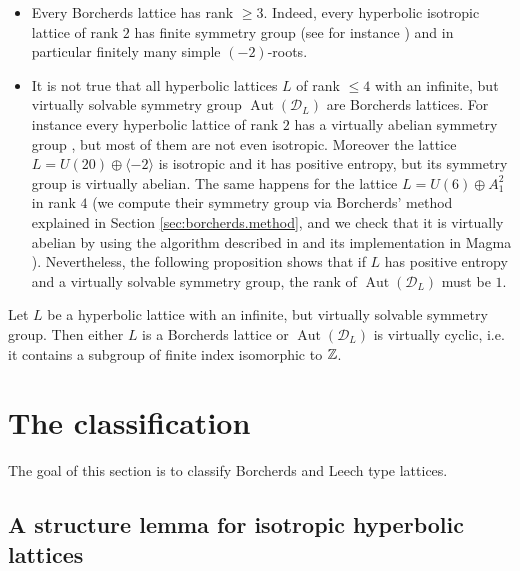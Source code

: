 \documentclass[11pt,letterpaper]{amsart}
\DeclareMathOperator{\Aut}{Aut}
\begin{document}
\begin{remark} \label{rk:useful.remarks.borcherds}
\begin{itemize}
    \item Every Borcherds lattice has rank $\ge 3$. Indeed, every hyperbolic isotropic lattice of rank $2$ %
    has finite symmetry group (see for instance \cite[Corollary~3.4]{galluzzi.lombardo.peters}) and in particular finitely many simple $(-2)$-roots.
   
    \item It is not true that all hyperbolic lattices $L$ of rank $\le 4$ with an infinite, but virtually solvable symmetry group $\Aut(\mathcal{D}_L)$ are Borcherds lattices. For instance every hyperbolic lattice of rank $2$ has a virtually abelian symmetry group \cite[Corollary~3.4]{galluzzi.lombardo.peters}, but most of them are not even isotropic.
    Moreover the lattice $L=U(20)\oplus \langle -2\rangle$ is isotropic and it has positive entropy, but its symmetry group is virtually abelian. The same happens for the lattice $L=U(6)\oplus A_1^2$ in rank $4$ (we compute their symmetry group via Borcherds' method explained in Section \ref{sec:borcherds.method}, and we check that it is virtually abelian by using the algorithm described in \cite{detinko.flannery.obrien.tits} and its implementation in Magma \cite{magma}).
    Nevertheless, the following proposition shows that if $L$ has positive entropy and a virtually solvable symmetry group, the rank of $\Aut(\mathcal{D}_L)$ must be $1$.
\end{itemize}
\end{remark}

\begin{proposition} \label{prop:virtually.abelian.positive.entropy} \cite[Theorems~5.5.9,~5.5.10]{ratcliffe}
Let $L$ be a hyperbolic lattice with an infinite, but virtually solvable symmetry group. Then either $L$ is a Borcherds lattice or $\Aut(\mathcal{D}_L)$ is virtually cyclic, i.e. it contains a subgroup of finite index isomorphic to $\mathbb{Z}$. 
\end{proposition}

\section{The classification} \label{sec:classification}

The goal of this section is to classify Borcherds and Leech type lattices. 

\subsection{A structure lemma for isotropic hyperbolic lattices}
\end{document}
